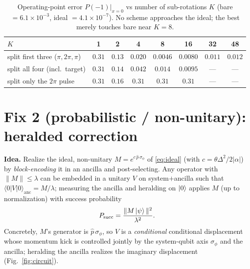 \documentclass[11pt]{article}
\begin{document}
\begin{table}[h]
\centering
\begin{tabular}{lccccccc}
\toprule
$K$ & 1 & 2 & 4 & 8 & 16 & 32 & 48 \\
\midrule
split first three ($\pi,2\pi,\pi$) & $0.31$ & $0.13$ & $0.020$ & $\mathbf{0.0046}$ & $0.0080$ & $0.011$ & $0.012$ \\
split all four (incl.\ target) & $0.31$ & $0.14$ & $0.042$ & $0.014$ & $0.0095$ & --- & --- \\
split only the $2\pi$ pulse & $0.31$ & $0.16$ & $0.31$ & $0.31$ & $0.31$ & --- & --- \\
\bottomrule
\end{tabular}
\caption{Operating-point error $P(-1)|_{x=0}$ vs number of sub-rotations $K$ (bare $=6.1\times10^{-3}$,
ideal $=4.1\times10^{-7}$). No scheme approaches the ideal; the best merely touches bare near $K{=}8$.}
\label{tab:split}
\end{table}

\section{Fix 2 (probabilistic / non-unitary): heralded correction}
\textbf{Idea.} Realize the ideal, non-unitary $M=e^{c\,\hat p\,\sigma_\phi}$ of \eqref{eq:ideal}
(with $c=\theta\Delta^2/2|\alpha|$) by \emph{block-encoding} it in an ancilla and post-selecting.
Any operator with $\|M\|\le\lambda$ can be embedded in a unitary $V$ on system$+$ancilla such that
$\langle 0|V|0\rangle_{\mathrm{anc}}=M/\lambda$; measuring the ancilla and heralding on
$\ket{0}$ applies $M$ (up to normalization) with success probability
\begin{equation}
P_{\mathrm{succ}}=\frac{\|M\ket{\psi}\|^2}{\lambda^2}.
\label{eq:psucc}
\end{equation}
Concretely, $M$'s generator is $\hat p\,\sigma_\phi$, so $V$ is a \emph{conditional} conditional
displacement whose momentum kick is controlled jointly by the system-qubit axis $\sigma_\phi$ and
the ancilla; heralding the ancilla realizes the imaginary displacement (Fig.~\ref{fig:circuit}).
\end{document}
